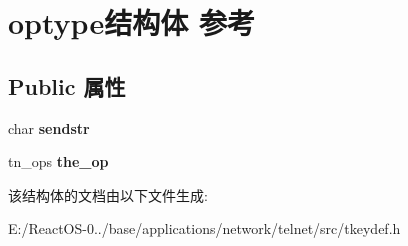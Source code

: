 \hypertarget{structoptype}{}\section{optype结构体 参考}
\label{structoptype}
\subsection*{Public 属性}
\begin{DoxyCompactItemize}
\item 
\mbox{\label{structoptype_ae24e7440a27d1b5143a9ad6b2727975e}} 
char {\bfseries sendstr}
\item 
\mbox{\label{structoptype_a9dc77acde979a6c3e50469e6588d7a23}} 
tn\+\_\+ops {\bfseries the\+\_\+op}
\end{DoxyCompactItemize}


该结构体的文档由以下文件生成\+:\begin{DoxyCompactItemize}
\item 
E\+:/\+React\+O\+S-\/0../base/applications/network/telnet/src/tkeydef.\+h\end{DoxyCompactItemize}
